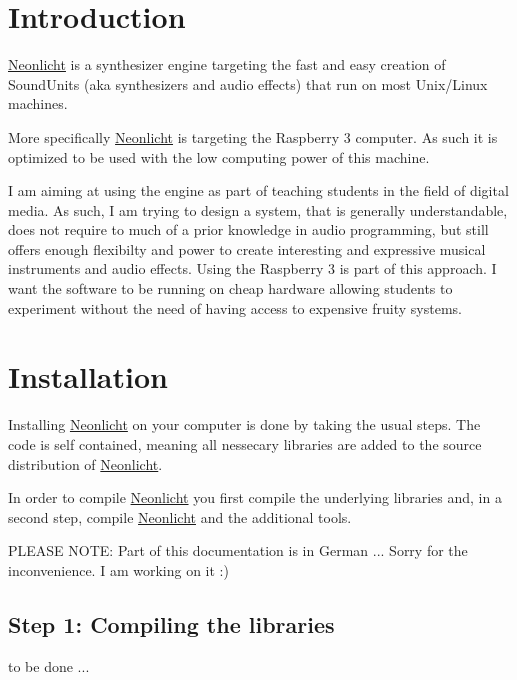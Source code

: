 \hypertarget{index_intro_sec}{}\section{Introduction}\label{index_intro_sec}
\hyperlink{classNeonlicht}{Neonlicht} is a synthesizer engine targeting the fast and easy creation of Sound\+Units (aka synthesizers and audio effects) that run on most Unix/\+Linux machines.

More specifically \hyperlink{classNeonlicht}{Neonlicht} is targeting the Raspberry 3 computer. As such it is optimized to be used with the low computing power of this machine.

I am aiming at using the engine as part of teaching students in the field of digital media. As such, I am trying to design a system, that is generally understandable, does not require to much of a prior knowledge in audio programming, but still offers enough flexibilty and power to create interesting and expressive musical instruments and audio effects. Using the Raspberry 3 is part of this approach. I want the software to be running on cheap hardware allowing students to experiment without the need of having access to expensive fruity systems.\hypertarget{index_install_sec}{}\section{Installation}\label{index_install_sec}
Installing \hyperlink{classNeonlicht}{Neonlicht} on your computer is done by taking the usual steps. The code is self contained, meaning all nessecary libraries are added to the source distribution of \hyperlink{classNeonlicht}{Neonlicht}.

In order to compile \hyperlink{classNeonlicht}{Neonlicht} you first compile the underlying libraries and, in a second step, compile \hyperlink{classNeonlicht}{Neonlicht} and the additional tools.

P\+L\+E\+A\+SE N\+O\+TE\+: Part of this documentation is in German ... Sorry for the inconvenience. I am working on it \+:)\hypertarget{index_step1}{}\subsection{Step 1\+: Compiling the libraries}\label{index_step1}
to be done ... 